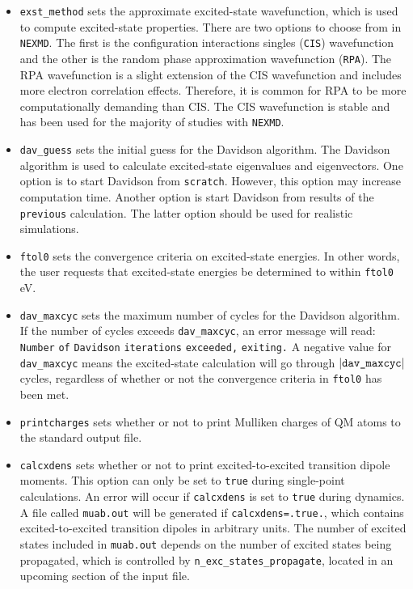 \documentclass[letterpaper,12pt,titlepage]{article}
\begin{document}
\begin{itemize}
\item \verb+exst_method+ sets the approximate excited-state wavefunction, which is used to compute excited-state properties.  There are two options to choose from in \verb+NEXMD+.  The first is the configuration interactions singles (\verb+CIS+) wavefunction and the other is the random phase approximation wavefunction (\verb+RPA+).  The RPA wavefunction is a slight extension of the CIS wavefunction and includes more electron correlation effects.  Therefore, it is common for RPA to be more computationally demanding than CIS.  The CIS wavefunction is stable and has been used for the majority of studies with \verb+NEXMD+.
\item \verb+dav_guess+ sets the initial guess for the Davidson algorithm.  The Davidson algorithm is used to calculate excited-state eigenvalues and eigenvectors.  One option is to start Davidson from \verb+scratch+.  However, this option may increase computation time.  Another option is start Davidson from results of the \verb+previous+ calculation.  The latter option should be used for realistic simulations.
\item \verb+ftol0+ sets the convergence criteria on excited-state energies.  In other words, the user requests that excited-state energies be determined to within \verb+ftol0+ eV.
\item \verb+dav_maxcyc+ sets the maximum number of cycles for the Davidson algorithm.  If the number of cycles exceeds \verb+dav_maxcyc+, an error message will read: \verb+Number+ \verb+of+ \verb+Davidson+ \verb+iterations+ \verb+exceeded,+ \verb+exiting.+  A negative value for \verb+dav_maxcyc+ means the excited-state calculation will go through $\left|\verb+dav_maxcyc+\right|$ cycles, regardless of whether or not the convergence criteria in \verb+ftol0+ has been met.
\item \verb+printcharges+ sets whether or not to print Mulliken charges of QM atoms to the standard output file.
\item \verb+calcxdens+ sets whether or not to print excited-to-excited transition dipole moments.  This option can only be set to \verb+true+ during single-point calculations.  An error will occur if \verb+calcxdens+ is set to \verb+true+ during dynamics.  A file called \verb+muab.out+ will be generated if \verb+calcxdens=.true.+, which contains excited-to-excited transition dipoles in arbitrary units.  The number of excited states included in \verb+muab.out+ depends on the number of excited states being propagated, which is controlled by \verb+n_exc_states_propagate+, located in an upcoming section of the input file.
\end{itemize}
\end{document}
